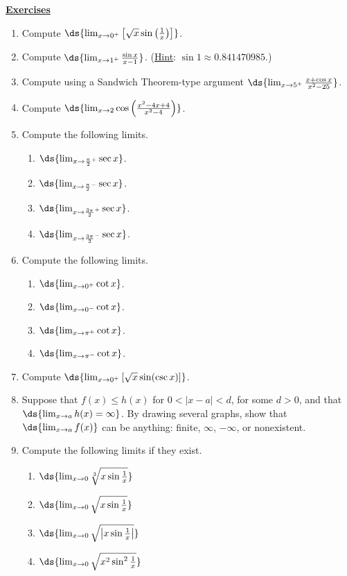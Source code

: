 \begin{center}
\underline{\Large{\bf Exercises}}\end{center}
\begin{multicols}{2}
\begin{enumerate}
\item Compute $\ds{\lim_{x\to0^+}\left[\sqrt{x}\sin\left(\frac1x\right)\right]
                   }$.
\item Compute $\ds{\lim_{x\to1^+}\frac{\sin x}{x-1}}$.
(\underline{Hint}: $\sin1\approx0.841470985$.)
\item Compute using a Sandwich Theorem-type argument
$\ds{\lim_{x\to5^+}\frac{x+\cos x}{x^2-25}}$.
\item Compute $\ds{\lim_{x\to2}\cos\left(\frac{x^2-4x+4}{x^2-4}\right)}$.
\item  Compute the following limits.
  \begin{enumerate}
  \item $\ds{\lim_{x\to{\frac{\pi}2}^+}\sec x}$.
  \item $\ds{\lim_{x\to{\frac{\pi}2}^-}\sec x}$.
  \item $\ds{\lim_{x\to{\frac{3\pi}2}^+}\sec x}$.
  \item $\ds{\lim_{x\to{\frac{3\pi}2}^-}\sec x}$.
  \end{enumerate}
\item Compute the following limits.
  \begin{enumerate}
  \item $\ds{\lim_{x\to 0^+}\cot x}$.
  \item $\ds{\lim_{x\to 0^-}\cot x}$.
  \item $\ds{\lim_{x\to\pi^+}\cot x}$.
  \item $\ds{\lim_{x\to \pi^-}\cot x}$.
  \end{enumerate}   
\item Compute $\ds{\lim_{x\to0^+}\left[\sqrt{x}\sin(\csc x)\right]}$.

\item Suppose that $f(x)\le h(x)$ for $0<|x-a|<d$, for some 
      $d>0$, and that $\ds{\lim_{x\to a}h(x)=\infty}$.
      By drawing several graphs, show that $\ds{\lim_{x\to a}f(x)}$
      can be anything: finite, $\infty$, $-\infty$, or nonexistent.
\item Compute the following limits if they exist.
  \begin{enumerate}
  \item $\ds{\lim_{x\to 0}\sqrt[3]{x\sin\frac1x}}$
  \item $\ds{\lim_{x\to 0}\sqrt{x\sin\frac1x}}$
  \item $\ds{\lim_{x\to 0}\sqrt{\left|x\sin\frac1x\right|}}$
  \item $\ds{\lim_{x\to 0}\sqrt{x^2\sin^2\frac1x}}$
  \end{enumerate}

\end{enumerate}
\end{multicols}

